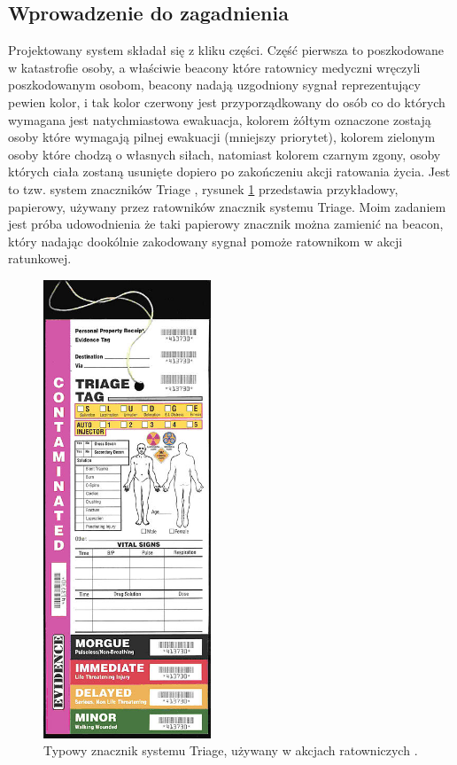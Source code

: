 \subsection{Wprowadzenie do zagadnienia}
Projektowany system składał się z kliku części. Część pierwsza to poszkodowane w katastrofie osoby, a właściwie beacony które ratownicy medyczni wręczyli poszkodowanym osobom, beacony nadają uzgodniony sygnał reprezentujący pewien kolor, i tak kolor czerwony jest przyporządkowany do osób co do których wymagana jest natychmiastowa ewakuacja, kolorem żółtym oznaczone zostają osoby które wymagają pilnej ewakuacji (mniejszy priorytet), kolorem zielonym osoby które chodzą o własnych siłach, natomiast kolorem czarnym zgony, osoby których ciała zostaną usunięte dopiero po zakończeniu akcji ratowania życia. Jest to tzw. system znaczników Triage \cite{triage}, rysunek \ref{fig:triage} przedstawia przykładowy, papierowy, używany przez ratowników znacznik systemu Triage. Moim zadaniem jest próba udowodnienia że taki papierowy znacznik można zamienić na beacon, który nadając dookólnie zakodowany sygnał pomoże ratownikom w akcji ratunkowej.

\begin{figure}[!th]
    \centering
    \includegraphics[width=5cm]{zalaczniki/obrazy/triage_tag.jpg}
    \caption{Typowy znacznik systemu Triage, używany w akcjach ratowniczych \cite{triage}.}
    \label{fig:triage}
\end{figure}

